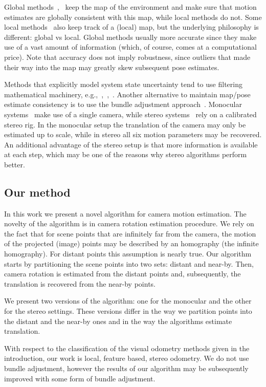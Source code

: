 \documentclass{bmvc2k}
\begin{document}
Global methods~\cite{Klein2007},~\cite{Newcombe2011} keep the map of
the environment and make sure that motion estimates are globally
consistent with this map, while local methods do not.  Some local
methods~\cite{Badino2013} also keep track of a (local) map, but the
underlying philosophy is different: global vs local.  Global methods
usually more accurate since they make use of a vast amount of
information (which, of course, comes at a computational price).  Note
that accuracy does not imply robustness, since outliers that made
their way into the map may greatly skew subsequent pose estimates.

Methods that explicitly model system state uncertainty tend to use
filtering mathematical machinery,
e.g.,~\cite{Konolige2010},~\cite{Olson2003},~\cite{Kaess2008}.
Another alternative to maintain map/pose estimate consistency is to
use the bundle adjustment approach~\cite{Triggs2000}. Monocular
systems~\cite{Song} make use of a single camera, while stereo
systems~\cite{Geiger2011} rely on a calibrated stereo rig. In the
monocular setup the translation of the camera may only be estimated up
to scale, while in stereo all six motion parameters may be
recovered. An additional advantage of the stereo setup is that more
information is available at each step, which may be one of the reasons
why stereo algorithms perform better.

\subsection{Our method}

In this work we present a novel algorithm for camera motion
estimation.  The novelty of the algorithm is in camera rotation
estimation procedure.  We rely on the fact that for scene points that
are infinitely far from the camera, the motion of the projected
(image) points may be described by an homography (the infinite
homography). For distant points this assumption is nearly true.  Our
algorithm starts by partitioning the scene points into two sets:
distant and near-by. Then, camera rotation is estimated from the
distant points and, subsequently, the translation is recovered from
the near-by points.

We present two versions of the algorithm: one for the monocular and
the other for the stereo settings.  These versions differ in the way
we partition points into the distant and the near-by ones and in the
way the algorithms estimate translation.

With respect to the classification of the visual odometry methods
given in the introduction, our work is local, feature based, stereo
odometry.  We do not use bundle adjustment, however the results of our
algorithm may be subsequently improved with some form of bundle
adjustment.
\end{document}
